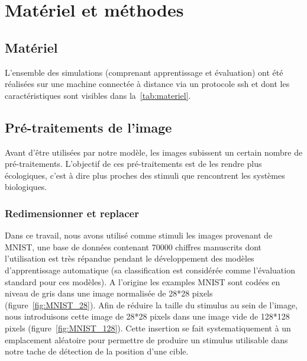 
\chapter{Matériel et méthodes} %
\label{Materiel_methode} %

\section{Matériel}
L'ensemble des simulations (comprenant apprentissage et évaluation) ont été réalisées sur une machine connectée à distance via un protocole ssh et dont les caractéristiques sont visibles dans la~\autoref{tab:materiel}. \\

\section{Pré-traitements de l'image}
Avant d'être utilisées par notre modèle, les images subissent un certain nombre de pré-traitements. L'objectif de ces pré-traitements est de les rendre plus écologiques, c'est à dire plus proches des stimuli que rencontrent les systèmes biologiques.

\subsection{Redimensionner et replacer}
Dans ce travail, nous avons utilisé comme stimuli les images provenant de MNIST, une base de données contenant 70000 chiffres manuscrits dont l'utilisation est très répandue pendant le développement des modèles d'apprentissage automatique (sa classification est considérée comme l'évaluation standard pour ces modèles).
A l'origine les examples MNIST sont codées en niveau de gris dans une image normalisée de 28*28 pixels (figure~\ref{fig:MNIST_28}).
Afin de réduire la taille du stimulus au sein de l'image, nous introduisons cette image de 28*28 pixels dans une image vide de 128*128 pixels (figure~\ref{fig:MNIST_128}).
Cette insertion se fait systematiquement à un emplacement aléatoire pour permettre de produire un stimulus utilisable dans notre tache de détection de la position d'une cible.

